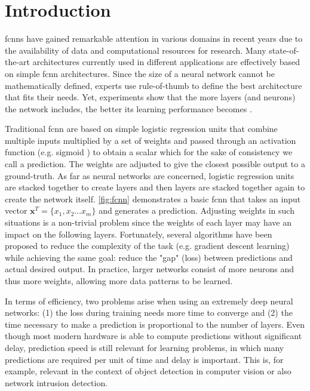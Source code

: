 \documentclass[conference]{IEEEtran}
\begin{document}
\section{Introduction}
\glspl{fcnn} have gained remarkable attention in various domains in recent years due to the availability of data and computational resources for research. Many state-of-the-art architectures currently used in different applications are effectively based on simple \gls{fcnn} architectures. Since the size of a neural network cannot be mathematically defined, experts use rule-of-thumb to define the best architecture that fits their needs. Yet, experiments show that the more layers (and neurons) the network includes, the better its learning performance becomes \cite{eldan_power_2016}.

Traditional \gls{fcnn} are based on simple logistic regression units that combine multiple inputs multiplied by a set of weights and passed through an activation function (e.g. sigmoid \cite{noauthor_sigmoid_2020}) to obtain a scalar which for the sake of consistency we call a prediction. The weights are adjusted to give the closest possible output to a ground-truth. As far as neural networks are concerned, logistic regression units are stacked together to create layers and then layers are stacked together again to create the network itself. \autoref{fig:fcnn} demonstrates a basic \gls{fcnn} that takes an input vector $\textbf{x}^{T} = \lbrace x_{1}, x_{2} ... x_{m} \rbrace$ and generates a prediction. Adjusting weights in such situations is a non-trivial problem since the weights of each layer may have an impact on the following layers. Fortunately, several algorithms have been proposed to reduce the complexity of the task (e.g. gradient descent learning) while achieving the same goal: reduce the "gap" (loss) between predictions and actual desired output. In practice, larger networks consist of more neurons and thus more weights, allowing more data patterns to be learned.

In terms of efficiency, two problems arise when using an extremely deep neural networks: (1) the loss during training needs more time to converge and (2) the time necessary to make a prediction is proportional to the number of layers. Even though most modern hardware is able to compute predictions without significant delay, prediction speed is still relevant for learning problems, in which many predictions are required per unit of time and delay is important. This is, for example, relevant in the context of object detection in computer vision or also network intrusion detection. 
\end{document}
